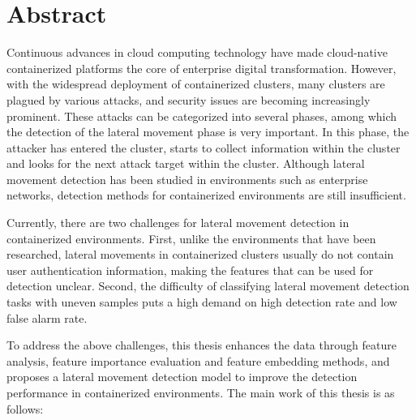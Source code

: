 \intobmk\chapter*{Abstract}%

Continuous advances in cloud computing technology have made cloud-native containerized platforms the core of enterprise digital transformation. However, with the widespread deployment of containerized clusters, many clusters are plagued by various attacks, and security issues are becoming increasingly prominent. These attacks can be categorized into several phases, among which the detection of the lateral movement phase is very important. In this phase, the attacker has entered the cluster, starts to collect information within the cluster and looks for the next attack target within the cluster. Although lateral movement detection has been studied in environments such as enterprise networks, detection methods for containerized environments are still insufficient.

Currently, there are two challenges for lateral movement detection in containerized environments. First, unlike the environments that have been researched, lateral movements in containerized clusters usually do not contain user authentication information, making the features that can be used for detection unclear. Second, the difficulty of classifying lateral movement detection tasks with uneven samples puts a high demand on high detection rate and low false alarm rate.

To address the above challenges, this thesis enhances the data through feature analysis, feature importance evaluation and feature embedding methods, and proposes a lateral movement detection model to improve the detection performance in containerized environments. The main work of this thesis is as follows:

